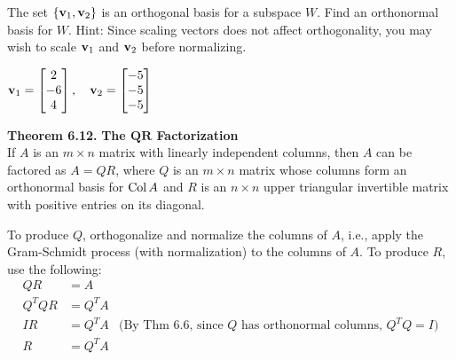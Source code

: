 \newpage


\begin{exercise} %
	The set $\{\boldsymbol{\mathbf{v}}_1,\boldsymbol{\mathbf{v}}_2\}$ is an orthogonal basis for a subspace $W$. Find an orthonormal basis for $W$. Hint: Since scaling vectors does not affect orthogonality, you may wish to scale $\boldsymbol{\mathbf{v}}_1$ and $\boldsymbol{\mathbf{v}}_2$ before normalizing.
	
	\vspace{1em}
	$ \boldsymbol{\mathbf{v}}_1 = \begin{bmatrix}2\\-6\\4\end{bmatrix}, \quad
	\boldsymbol{\mathbf{v}}_2 = \begin{bmatrix}-5\\-5\\-5\end{bmatrix} $
\end{exercise}
\vspace{1.75in}


\begin{boxthm}
	\textbf{Theorem 6.12.}
	\textbf{The $\boldsymbol{QR}$ Factorization} \\
	If $A$ is an $m\times n$ matrix with linearly independent columns, then $A$ can be factored as $A=QR$, where $Q$ is an $m\times n$ matrix whose columns form an orthonormal basis for $\operatorname{Col} A$ and $R$ is an $n\times n$ upper triangular invertible matrix with positive entries on its diagonal.
\end{boxthm}
\vspace{-1em}
\begin{boxme}
	To produce $Q$, orthogonalize and normalize the columns of $A$, i.e., apply the Gram-Schmidt process (with normalization) to the columns of $A$. To produce $R$, use the following:
	\vspace{-1em}
	\begin{align*}
	QR &= A \\
	Q^TQR &= Q^TA \\
	IR &= Q^TA &\text{(By Thm 6.6, since $Q$ has orthonormal columns, $Q^TQ=I$)}\\
	R &= Q^TA
	\end{align*}
\end{boxme}


